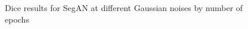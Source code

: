 \begin{figure}
    \centerline{}
    \caption{Dice results for SegAN at different Gaussian noises by number of epochs}
    \label{fig:all-noises-by-epoch-dice-segan}
\end{figure}

